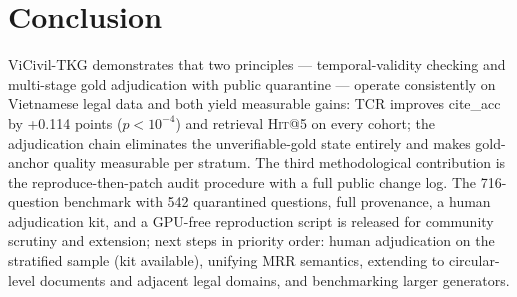 \documentclass[10pt,a4paper,twocolumn]{article}
\newcommand{\hit}{\textsc{Hit}}
\begin{document}
\section{Conclusion}

ViCivil-TKG demonstrates that two principles --- temporal-validity checking and multi-stage gold adjudication with public quarantine --- operate consistently on Vietnamese legal data and both yield measurable gains: TCR improves cite\_acc by +0.114 points ($p<10^{-4}$) and retrieval \hit{}@5 on every cohort; the adjudication chain eliminates the unverifiable-gold state entirely and makes gold-anchor quality measurable per stratum. The third methodological contribution is the reproduce-then-patch audit procedure with a full public change log. The 716-question benchmark with 542 quarantined questions, full provenance, a human adjudication kit, and a GPU-free reproduction script is released for community scrutiny and extension; next steps in priority order: human adjudication on the stratified sample (kit available), unifying MRR semantics, extending to circular-level documents and adjacent legal domains, and benchmarking larger generators.
\end{document}
